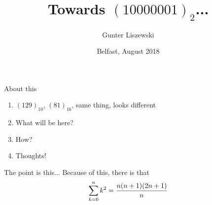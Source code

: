 \documentclass[pdf]{beamer}
\title{Towards $(10000001)_2$...}
\author{Gunter Liszewski}
\date{Belfast, August 2018}
\begin{document}
\begin{frame}
  \titlepage
\end{frame}


\begin{frame}{About this}

  \begin{enumerate}{0}
    \pause
    \item $(129)_{10}$, $(81)_{16}$, same thing, looks different
    \pause
    \item What will be here?
    \pause
    \item How?
    \pause
    \item Thoughts!
  \end{enumerate}
\end{frame}

\begin{frame}{The point is this...}
  Because of this, there is that
$$\sum_{k=0}^{n}{k^2}={n(n+1)(2n+1)\over n}$$
\end{frame}
\end{document}
